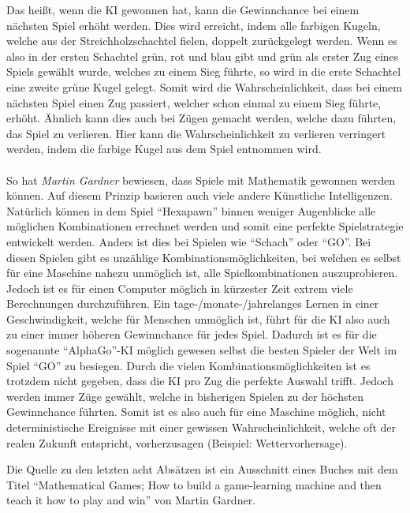 Das heißt, wenn die KI gewonnen hat, kann die Gewinnchance bei einem nächsten Spiel erhöht werden. Dies wird erreicht, indem alle farbigen Kugeln, welche aus der Streichholzschachtel fielen, doppelt zurückgelegt werden. Wenn es also in der ersten Schachtel grün, rot und blau gibt und grün als erster Zug eines Spiels gewählt wurde, welches zu einem Sieg führte, so wird in die erste Schachtel eine zweite grüne Kugel gelegt. Somit wird die Wahrscheinlichkeit, dass bei einem nächsten Spiel einen Zug passiert, welcher schon einmal zu einem Sieg führte, erhöht. Ähnlich kann dies auch bei Zügen gemacht werden, welche dazu führten, das Spiel zu verlieren. Hier kann die Wahrscheinlichkeit zu verlieren verringert werden, indem die farbige Kugel aus dem Spiel entnommen wird.\\
\\
So hat \textit{Martin Gardner} bewiesen, dass Spiele mit Mathematik gewonnen werden können. Auf diesem Prinzip basieren auch viele andere Künstliche Intelligenzen. Natürlich können in dem Spiel ``Hexapawn'' binnen weniger Augenblicke alle möglichen Kombinationen errechnet werden und somit eine perfekte Spielstrategie entwickelt werden. Anders ist dies bei Spielen wie ``Schach'' oder ``GO''. Bei diesen Spielen gibt es unzählige Kombinationsmöglichkeiten, bei welchen es selbst für eine Maschine nahezu unmöglich ist, alle Spielkombinationen auszuprobieren. Jedoch ist es für einen Computer möglich in kürzester Zeit extrem viele Berechnungen durchzuführen. Ein tage-/monate-/jahrelanges Lernen in einer Geschwindigkeit, welche für Menschen unmöglich ist, führt für die KI also auch zu einer immer höheren Gewinnchance für jedes Spiel. Dadurch ist es für die sogenannte ``AlphaGo''-KI möglich gewesen selbst die besten Spieler der Welt im Spiel ``GO'' zu besiegen. Durch die vielen Kombinationsmöglichkeiten ist es trotzdem nicht gegeben, dass die KI pro Zug die perfekte Auswahl trifft. Jedoch werden immer Züge gewählt, welche in bisherigen Spielen zu der höchsten Gewinnchance führten. Somit ist es also auch für eine Maschine möglich, nicht deterministische Ereignisse mit einer gewissen Wahrscheinlichkeit, welche oft der realen Zukunft entspricht, vorherzusagen (Beispiel: Wettervorhersage).

Die Quelle zu den letzten acht Absätzen ist ein Ausschnitt eines Buches mit dem Titel ``Mathematical Games; How to build a game-learning machine and then teach it how to play and win'' von Martin Gardner. \cite{mathgames}


\newpage
